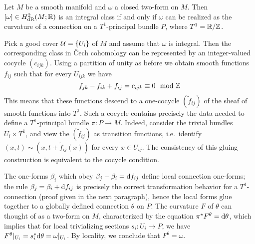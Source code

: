 \documentclass[parskip=half]{scrartcl}
\begin{document}
\begin{prop}
	Let $M$ be a smooth manifold and $\omega$ a closed two-form on $M$. Then $[\omega]\in H^2_\text{dR}(M;\mathbb{R})$ is an integral class if and only if $\omega$ can be realized as the curvature of a connection on a $T^1$-principal bundle $P$, where $T^1=\mathbb{R}/\mathbb{Z}$.
\end{prop}
\begin{myproof}
	Pick a good cover $\mathcal{U}=\{U_i\}$ of $M$ and assume that $\omega$ is integral. Then the corresponding class in \v{C}ech cohomology can be represented by an integer-valued cocycle $(c_{ijk})$. Using a partition of unity as before we obtain smooth functions $f_{ij}$ such that for every $U_{ijk}$ we have
	\begin{equation*}
		f_{jk}-f_{ik}+f_{ij}=c_{ijk}\equiv 0 \mod {\mathbb{Z}}
	\end{equation*}
	This means that these functions descend to a one-cocycle $(\tilde f_{ij})$ of the sheaf of smooth functions into $T^1$. Such a cocycle contains precisely the data needed to define a $T^1$-principal bundle $\pi:P\to M$. Indeed, consider the trivial bundles $U_i\times T^1$, and view the $(\tilde f_{ij})$ as transition functions, i.e.~identify $(x,t)\sim(x,t+\tilde f_{ij}(x))$ for every $x\in U_{ij}$. The consistency of this gluing construction is equivalent to the cocycle condition.	
	
	The one-forms $\beta_i$ which obey $\beta_j-\beta_i=\mathrm{d} f_{ij}$ define local connection one-forms; the rule $
	\beta_j=\beta_i+\mathrm{d} f_{ij}$ is precisely the correct transformation behavior for a $T^1$-connection (proof given in the next paragraph), hence the local forms glue together to a globally defined connection $\theta$ on $P$. The curvature $F$ of $\theta$ can thought of as a two-form on $M$, characterized by the equation $\pi^*F^\theta=\mathrm{d}\theta$, which implies that for local trivializing sections $s_i:U_i\to P$, we have $F^\theta|_{U_i}=s_i^*\mathrm{d} \theta=\omega|_{U_i}$. By locality, we conclude that $F^\theta=\omega$.
	

\end{myproof}
\end{document}
